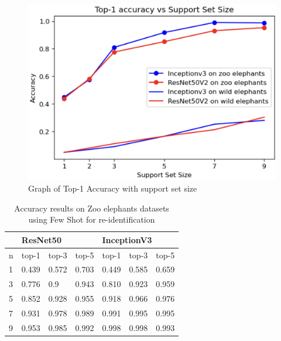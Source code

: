 \documentclass[10pt,twocolumn,letterpaper]{article}
\begin{document}
\begin{figure}[t]
 \centering
 \includegraphics[scale=0.35]{few_shot_graph}
  \caption{Graph of Top-1 Accuracy with support set size}
  \label{fig:few_shot_graph}
\end{figure}


\begin{table}[]
\begin{tabular}{@{}lllllll@{}}
\toprule
                       & \multicolumn{3}{l}{ResNet50}               & \multicolumn{3}{l}{InceptionV3} \\ \midrule
\multicolumn{1}{l|}{n} & top-1 & top-3 & \multicolumn{1}{l|}{top-5} & top-1     & top-3    & top-5    \\ \midrule
\multicolumn{1}{l|}{1} & 0.439 & 0.572 & \multicolumn{1}{l|}{0.703} & 0.449     & 0.585    & 0.659    \\
\multicolumn{1}{l|}{3} & 0.776 & 0.9   & \multicolumn{1}{l|}{0.943} & 0.810     & 0.923    & 0.959    \\
\multicolumn{1}{l|}{5} & 0.852 & 0.928 & \multicolumn{1}{l|}{0.955} & 0.918     & 0.966    & 0.976    \\
\multicolumn{1}{l|}{7} & 0.931 & 0.978 & \multicolumn{1}{l|}{0.989} & 0.991     & 0.995    & 0.995    \\
\multicolumn{1}{l|}{9} & 0.953 & 0.985 & \multicolumn{1}{l|}{0.992} & 0.998     & 0.998    & 0.993   
\end{tabular}
\caption{Accuracy results on Zoo elephants datasets using Few Shot for re-identification}
\label{tab:few-shot-results}
\end{table}
\end{document}
